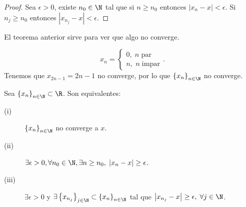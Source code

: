 \begin{proof}
Sea $\displaystyle \epsilon > 0 $, existe $\displaystyle n_{0} \in \N $ tal que si $\displaystyle n \geq n_{0} $ entonces $\displaystyle \left|x_{n}-x\right| < \epsilon  $. Si $\displaystyle n_{j} \geq n_{0} $ entonces $\displaystyle \left|x_{n_{j}}-x\right| < \epsilon  $.
\end{proof}

\begin{observation}
\normalfont El teorema anterior sirve para ver que algo no converge. 
\end{observation}

\begin{eg}
\normalfont 
\[x_{n} = 
\begin{cases}
0, \; n \; \text{par}\\
n, \; n \; \text{impar}
\end{cases}
.\]
Tenemos que $\displaystyle x_{2n-1} = 2n-1 $ no converge, por lo que $\displaystyle \left\{ x_{n}\right\} _{n\in\N} $ no converge.
\end{eg}

\begin{ftheorem}[]
	\normalfont Sea $\displaystyle \left\{ x_{n}\right\} _{n\in\N}\subset\R $. Son equivalentes:
	\begin{description}
		\item[(i)] $\displaystyle \left\{ x_{n}\right\} _{n\in\N} $ no converge a $\displaystyle x $.
		\item[(ii)] $\displaystyle \exists \epsilon > 0, \forall n_{0} \in \N, \exists n\geq n_{0}, \; \left|x_{n}-x\right| \geq \epsilon  $.
		\item[(iii)] $\displaystyle \exists \epsilon > 0 $ y $\displaystyle \exists \left\{ x_{n_{j}}\right\} _{j\in\N}\subset \left\{ x_{n}\right\} _{n\in\N} $ tal que $\displaystyle \left|x_{n_{j}}-x\right| \geq \epsilon , \; \forall j \in \N $.
	\end{description}
\end{ftheorem}

